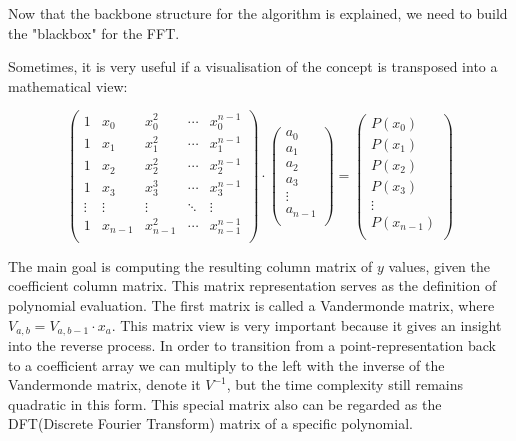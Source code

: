 \documentclass[letterpaper]{article}
\begin{document}
Now that the backbone structure for the algorithm is explained, we need to build the "blackbox" for the FFT.

Sometimes, it is very useful if a visualisation of the concept is transposed into a mathematical view:

$$
 \begin{pmatrix}
   1 & x_{0} & x_{0}^{2} &\cdots & x_{0}^{n - 1} \\
   1 & x_{1} & x_{1}^{2} &\cdots & x_{1}^{n - 1} \\
   1 & x_{2} & x_{2}^{2} &\cdots & x_{2}^{n - 1} \\
   1 & x_{3} & x_{3}^{3} &\cdots & x_{3}^{n - 1} \\
   \vdots  & \vdots  & \vdots & \ddots  & \vdots \\
   1 & x_{n - 1} & x_{n - 1}^{2} &\cdots & x_{n - 1}^{n - 1} \\
 \end{pmatrix}
 \cdot
 \begin{pmatrix}
 a_{0} \\
 a_{1} \\
 a_{2} \\
 a_{3} \\
 \vdots \\
 a_{n - 1} \\
 \end{pmatrix}
 =
 \begin{pmatrix}
 P(x_{0}) \\
 P(x_{1}) \\
 P(x_{2}) \\
 P(x_{3}) \\
 \vdots \\
 P(x_{n-1}) \\
 \end{pmatrix}
$$

The main goal is computing the resulting column matrix of $y$ values, given the coefficient column matrix. This matrix representation serves as the definition of polynomial evaluation. The first matrix is called a Vandermonde matrix, where $V_{a,b} = V_{a, b - 1} \cdot x_{a}$. This matrix view is very important because it gives an insight into the reverse process. In order to transition from a point-representation back to a coefficient array we can multiply to the left with the inverse of the Vandermonde matrix, denote it $V^{-1}$, but the time complexity still remains quadratic in this form. This special matrix also can be regarded as the DFT(Discrete Fourier Transform) matrix of a specific polynomial.
\end{document}
